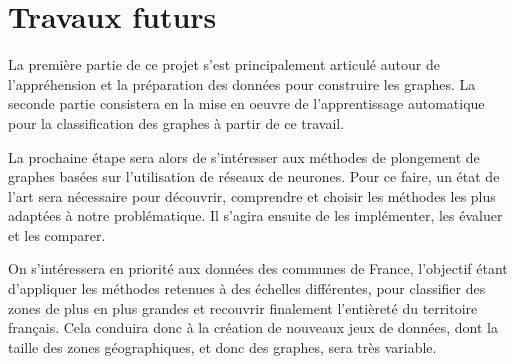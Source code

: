 \chapter{Travaux futurs}

La première partie de ce projet s'est principalement articulé autour de l'appréhension et la préparation des données
pour construire les graphes.
La seconde partie consistera en la mise en oeuvre de l'apprentissage automatique pour la classification des graphes à
partir de ce travail.

La prochaine étape sera alors de s'intéresser aux méthodes de plongement de graphes basées sur l'utilisation de réseaux
de neurones.
Pour ce faire, un état de l'art sera nécessaire pour découvrir, comprendre et choisir les méthodes les plus adaptées à
notre problématique.
Il s'agira ensuite de les implémenter, les évaluer et les comparer.

On s'intéressera en priorité aux données des communes de France, l'objectif étant d'appliquer les méthodes retenues à
des échelles différentes, pour classifier des zones de plus en plus grandes et recouvrir finalement l'entièreté du
territoire français.
Cela conduira donc à la création de nouveaux jeux de données, dont la taille des zones géographiques, et donc des
graphes, sera très variable.


